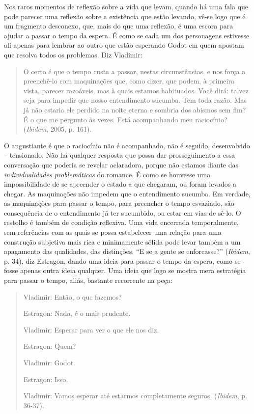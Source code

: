 Nos raros momentos de reflexão sobre a vida que levam, quando há uma
fala que pode parecer uma reflexão sobre a existência que estão levando,
vê-se logo que é um fragmento desconexo, que, mais do que uma reflexão,
é uma escora para ajudar a passar o tempo da espera. É como se cada um
dos personagens estivesse ali apenas para lembrar ao outro que estão
esperando Godot em quem apostam que resolva todos os problemas. Diz
Vladimir:

\begin{quote}
O certo é que o tempo custa a passar, nestas circunstâncias, e nos força
a preenchê-lo com maquinações que, como dizer, que podem, à primeira
vista, parecer razoáveis, mas à quais estamos habituados. Você dirá:
talvez seja para impedir que nosso entendimento sucumba. Tem toda razão.
Mas já não estaria ele perdido na noite eterna e sombria dos abismos sem
fim? É o que me pergunto às vezes. Está acompanhando meu raciocínio?
(\emph{Ibidem}, 2005, p. 161).
\end{quote}

O angustiante é que o raciocínio não é acompanhado, não é seguido,
desenvolvido -- tensionado. Não há qualquer resposta que possa dar
prosseguimento a essa conversação que poderia se revelar aclaradora,
porque não estamos diante das \emph{individualidades problemáticas} do
romance. É como se houvesse uma impossibilidade de se apreender o estado
a que chegaram, ou foram levados a chegar. As maquinações não impedem
que o entendimento sucumba. Em verdade, as maquinações para passar o
tempo, para preencher o tempo esvaziado, são consequência de o
entendimento já ter sucumbido, ou estar em vias de sê-lo. O restolho é
também de condição reflexiva. Uma vida encerrada temporalmente, sem
referências com as quais se possa estabelecer uma relação para uma
construção subjetiva mais rica e minimamente sólida pode levar também a
um apagamento das qualidades, das distinções. ``E se a gente se
enforcasse?'' (\emph{Ibidem}, p. 34), diz Estragon, dando uma ideia para
passar o tempo da espera, como se fosse apenas outra ideia qualquer. Uma
ideia que logo se mostra mera estratégia para passar o tempo, aliás,
bastante recorrente na peça:

\begin{quote}
Vladimir: Então, o que fazemos?

Estragon: Nada, é o mais prudente.

Vladimir: Esperar para ver o que ele nos diz.

Estragon: Quem?

Vladimir: Godot.

Estragon: Isso.

Vladimir: Vamos esperar até estarmos completamente seguros.
(\emph{Ibidem}, p. 36-37).
\end{quote}

